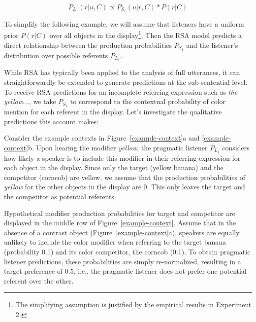 \documentclass[10pt,letterpaper]{article}
\begin{document}
\begin{equation}
	P_{L_1}(r|u,C) \propto P_{S_1}(u|r,C) * P(r|C)
\label{eq-prior}
\end{equation}

To simplify the following example, we will assume that listeners have a uniform prior $P(r|C)$ over all objects in the display\footnote{The simplifying assumption is justified by the empirical results in Experiment 2.}. Then the RSA model predicts a direct relationship between the production probabilities $P_{S_1}$ and the listener's distribution over possible referents $P_{L_1}$. 

While RSA has typically been applied to the analysis of full utterances, it can straightforwardly be extended to generate predictions at the sub-sentential level. To receive RSA predictions for an incomplete referring expression such as \textit{the yellow...}, we take $P_{S_1}$ to correspond to the contextual probability of color mention for each referent in the display. Let's investigate the qualitative predictions this account makes:

Consider the example contexts in Figure~\ref{example-context}a and \ref{example-context}b. Upon hearing the modifier \textit{yellow}, the pragmatic listener $P_{L_1}$ considers how likely a speaker is to include this modifier in their referring expression for each object in the display. Since only the target (yellow banana) and the competitor (corncob) are yellow, we assume that the production probabilities of \textit{yellow} for the other objects in the display are 0. This only leaves the target and the competitor as potential referents. 

Hypothetical modifier production probabilities for target and competitor are displayed in the middle row of Figure~\ref{example-context}. 
Assume that in the absence of a contrast object (Figure~\ref{example-context}a), speakers are equally unlikely to include the color modifier when referring to the target banana (probability 0.1) and its color competitor, the corncob (0.1). To obtain pragmatic listener predictions, these probabilities are simply re-normalized, resulting in a target preference of 0.5, i.e., the pragmatic listener does not  prefer one potential referent over the other.
\end{document}
